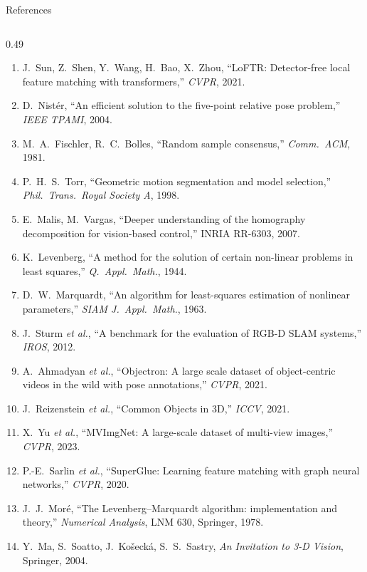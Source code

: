 \documentclass[aspectratio=169,10pt]{beamer}
\begin{document}
\begin{frame}{References}
\begin{columns}[T]
\begin{column}{0.49\textwidth}
      \tiny
      \begin{enumerate}
        \item[{[13]}] J.~Sun, Z.~Shen, Y.~Wang, H.~Bao, X.~Zhou, ``LoFTR: Detector-free local feature matching with transformers,'' \emph{CVPR}, 2021.
        \item[{[14]}] D.~Nist\'er, ``An efficient solution to the five-point relative pose problem,'' \emph{IEEE TPAMI}, 2004.
        \item[{[15]}] M.~A.~Fischler, R.~C.~Bolles, ``Random sample consensus,'' \emph{Comm.\ ACM}, 1981.
        \item[{[16]}] P.~H.~S.~Torr, ``Geometric motion segmentation and model selection,'' \emph{Phil.\ Trans.\ Royal Society A}, 1998.
        \item[{[17]}] E.~Malis, M.~Vargas, ``Deeper understanding of the homography decomposition for vision-based control,'' INRIA RR-6303, 2007.
        \item[{[18]}] K.~Levenberg, ``A method for the solution of certain non-linear problems in least squares,'' \emph{Q.\ Appl.\ Math.}, 1944.
        \item[{[19]}] D.~W.~Marquardt, ``An algorithm for least-squares estimation of nonlinear parameters,'' \emph{SIAM J.\ Appl.\ Math.}, 1963.
        \item[{[20]}] J.~Sturm \emph{et al.}, ``A benchmark for the evaluation of RGB-D SLAM systems,'' \emph{IROS}, 2012.
        \item[{[21]}] A.~Ahmadyan \emph{et al.}, ``Objectron: A large scale dataset of object-centric videos in the wild with pose annotations,'' \emph{CVPR}, 2021.
        \item[{[22]}] J.~Reizenstein \emph{et al.}, ``Common Objects in 3D,'' \emph{ICCV}, 2021.
        \item[{[23]}] X.~Yu \emph{et al.}, ``MVImgNet: A large-scale dataset of multi-view images,'' \emph{CVPR}, 2023.
        \item[{[24]}] P.-E.~Sarlin \emph{et al.}, ``SuperGlue: Learning feature matching with graph neural networks,'' \emph{CVPR}, 2020.
        \item[{[25]}] J.~J.~Mor\'e, ``The Levenberg--Marquardt algorithm: implementation and theory,'' \emph{Numerical Analysis}, LNM 630, Springer, 1978.
        \item[{[26]}] Y.~Ma, S.~Soatto, J.~Ko\v{s}eck\'a, S.~S.~Sastry, \emph{An Invitation to 3-D Vision}, Springer, 2004.
      \end{enumerate}
    \end{column}
  \end{columns}
\end{frame}
\end{document}
